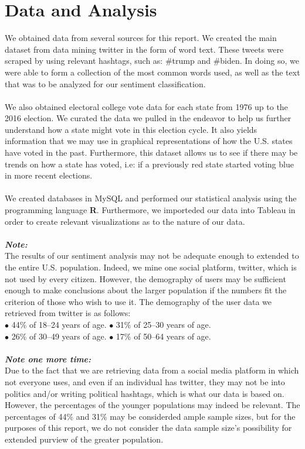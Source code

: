 \documentclass[11pt, oneside]{article}
\begin{document}
\section{Data and Analysis}
We obtained data from several sources for this report. We created the main dataset from data mining twitter in the form of word text. These tweets were scraped by using relevant hashtags, such as: \#trump and \#biden. In doing so, we were able to form a collection of the most common words used, as well as the text that was to be analyzed for our sentiment classification.\\
\\
We also obtained electoral college vote data for each state from 1976 up to the 2016 election. We curated the data we pulled in the endeavor to help us further understand how a state might vote in this election cycle. It also yields information that we may use in graphical representations of how the U.S. states have voted in the past. Furthermore, this dataset allows us to see if there may be trends on how a state has voted, i.e: if a previously red state started voting blue in more recent elections.\\
\\
We created databases in MySQL and performed our statistical analysis using the programming language \textbf\textsf{R}. Furthermore, we importeded our data into Tableau in order to create relevant visualizations as to the nature of our data.\\
\\
\textbf{\emph{Note:}}\\
The results of our sentiment analysis may not be adequate enough to extended to the entire U.S. population. Indeed, we mine one social platform, twitter, which is not used by every citizen. However, the demography of users may be sufficient enough to make conclusions about the larger population if the numbers fit the criterion of those who wish to use it. The demography of the user data we retrieved from twitter is as follows:\\
$\bullet$ 44\% of 18–24 years of age. $\bullet$ 31\% of 25–30 years of age.\\
$\bullet$ 26\% of 30–49 years of age. $\bullet$ 17\% of 50–64 years of age.\\
\\
\textbf{\emph{Note one more time:}}\\
Due to the fact that we are retrieving data from a social media platform in which not everyone uses, and even if an individual has twitter, they may not be into politics and/or writing political hashtags, which is what our data is based on. However, the percentages of the younger populations may indeed be relevant. The percentages of 44\% and 31\% may be considerded ample sample sizes, but for the purposes of this report, we do not consider the data sample size's possibility for extended purview of the greater population.\\
\end{document}
